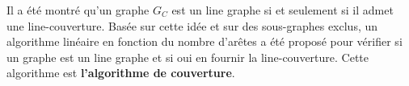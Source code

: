 Il a \'et\'e montr\'e qu'un graphe $G_C$ est  un line graphe si et seulement si il admet une line-couverture.
Bas\'ee sur cette id\'ee et sur des sous-graphes exclus, un algorithme lin\'eaire en fonction du nombre d'ar\^etes a \'et\'e propos\'e pour v\'erifier  si un graphe est un line graphe et si oui en fournir la line-couverture.
Cette algorithme est {\bf l'algorithme de couverture}.